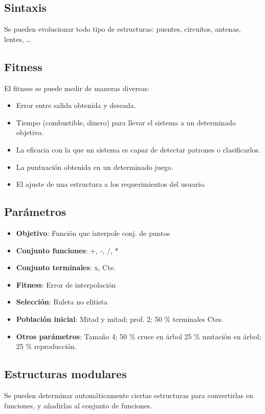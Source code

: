 \documentclass[12pt, twoside, openright]{report} %
\begin{document}
\subsection{Sintaxis}
Se pueden evolucionar todo tipo de estructuras: puentes, circuitos, antenas, lentes, …

\subsection{Fitness}
El fitness se puede medir de maneras diversas:
\begin{itemize}
    \item Error entre salida obtenida y deseada.
    \item Tiempo (combustible, dinero) para llevar el sistema a un determinado objetivo.
    \item La eficacia con la que un sistema es capaz de detectar patrones o clasificarlos.
    \item La puntuación obtenida en un determinado juego.
    \item El ajuste de una estructura a los requerimientos del usuario.
\end{itemize}

\subsection{Parámetros}
\begin{itemize}
    \item \textbf{Objetivo}: Función que interpole conj. de puntos
    \item \textbf{Conjunto funciones}: {+, -, /, *}
    \item \textbf{Conjunto terminales}: {x, Cte.}
    \item \textbf{Fitness}: Error de interpolación
    \item \textbf{Selección}: Ruleta no elitista
    \item \textbf{Población inicial}: Mitad y mitad; prof. 2; 50 \% terminales Ctes.
    \item \textbf{Otros parámetros}: Tamaño 4; 50 \% cruce en árbol 25 \% mutación en árbol; 25 \% reproducción.
\end{itemize}

\subsection{Estructuras modulares}
Se pueden determinar automáticamente ciertas estructuras para convertirlas en funciones, y añadirlas al conjunto de funciones.
\end{document}

